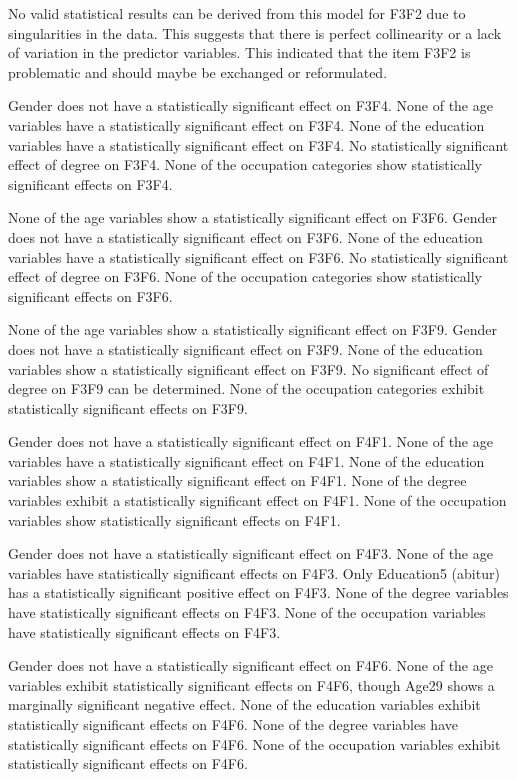 \documentclass[
  12pt,
  a4paper,
  twoside]{article}
\begin{document}
No valid statistical results can be derived from this model for F3F2 due to singularities in the data. This suggests that there is perfect collinearity or a lack of variation in the predictor variables.
This indicated that the item F3F2 is problematic and should maybe be exchanged or reformulated.

Gender does not have a statistically significant effect on F3F4.
None of the age variables have a statistically significant effect on F3F4.
None of the education variables have a statistically significant effect on F3F4.
No statistically significant effect of degree on F3F4.
None of the occupation categories show statistically significant effects on F3F4.

None of the age variables show a statistically significant effect on F3F6.
Gender does not have a statistically significant effect on F3F6.
None of the education variables have a statistically significant effect on F3F6.
No statistically significant effect of degree on F3F6.
None of the occupation categories show statistically significant effects on F3F6.

None of the age variables show a statistically significant effect on F3F9.
Gender does not have a statistically significant effect on F3F9.
None of the education variables show a statistically significant effect on F3F9.
No significant effect of degree on F3F9 can be determined.
None of the occupation categories exhibit statistically significant effects on F3F9.

Gender does not have a statistically significant effect on F4F1.
None of the age variables have a statistically significant effect on F4F1.
None of the education variables show a statistically significant effect on F4F1.
None of the degree variables exhibit a statistically significant effect on F4F1.
None of the occupation variables show statistically significant effects on F4F1.

Gender does not have a statistically significant effect on F4F3.
None of the age variables have statistically significant effects on F4F3.
Only Education5 (abitur) has a statistically significant positive effect on F4F3.
None of the degree variables have statistically significant effects on F4F3.
None of the occupation variables have statistically significant effects on F4F3.

Gender does not have a statistically significant effect on F4F6.
None of the age variables exhibit statistically significant effects on F4F6, though Age29 shows a marginally significant negative effect.
None of the education variables exhibit statistically significant effects on F4F6.
None of the degree variables have statistically significant effects on F4F6.
None of the occupation variables exhibit statistically significant effects on F4F6.
\end{document}
